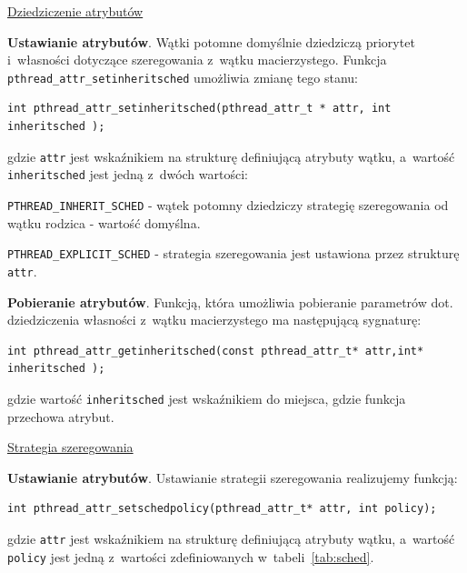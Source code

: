 \underline{Dziedziczenie atrybutów}


\noindent\textbf{Ustawianie atrybutów}. Wątki potomne domyślnie dziedziczą priorytet i~własności dotyczące szeregowania z~wątku macierzystego. Funkcja \lstinline[style=MyCStyle]{pthread_attr_setinheritsched} umożliwia zmianę tego stanu: 

\begin{lstlisting}[style=MyCStyle]
int pthread_attr_setinheritsched(pthread_attr_t * attr, int inheritsched );
\end{lstlisting}

gdzie \lstinline[style=MyCStyle]{attr} jest wskaźnikiem na strukturę definiującą atrybuty wątku, a~wartość \lstinline[style=MyCStyle]{inheritsched} jest jedną z~dwóch wartości: 

\begin{myitemize}
\item \lstinline[style=MyCStyle]{PTHREAD_INHERIT_SCHED} - wątek potomny dziedziczy strategię szeregowania od wątku rodzica - wartość domyślna.
\item \lstinline[style=MyCStyle]{PTHREAD_EXPLICIT_SCHED} - strategia szeregowania jest ustawiona przez strukturę \lstinline[style=MyCStyle]{attr}. 
\end{myitemize}

\noindent\textbf{Pobieranie atrybutów}. Funkcją, która umożliwia pobieranie parametrów dot. dziedziczenia własności z~wątku macierzystego ma następującą sygnaturę:  

\begin{lstlisting}[style=MyCStyle]
int pthread_attr_getinheritsched(const pthread_attr_t* attr,int* inheritsched );
\end{lstlisting}

gdzie wartość \lstinline[style=MyCStyle]{inheritsched} jest wskaźnikiem do miejsca, gdzie funkcja przechowa atrybut. 

\noindent\underline{Strategia szeregowania}
 
\noindent\textbf{Ustawianie atrybutów}. Ustawianie strategii szeregowania realizujemy funkcją: 

\begin{lstlisting}[style=MyCStyle]
int pthread_attr_setschedpolicy(pthread_attr_t* attr, int policy);
\end{lstlisting}

gdzie \lstinline[style=MyCStyle]{attr} jest wskaźnikiem na strukturę definiującą atrybuty wątku, a~wartość \lstinline[style=MyCStyle]{policy} jest jedną z~wartości zdefiniowanych w~tabeli~\ref{tab:sched}.

